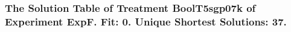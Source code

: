  \begin{frame}
 \fontsize{8pt}{9pt}\selectfont
 \frametitle{ The Solution Table of Treatment BoolT5sgp07k of Experiment ExpF. Fit: 0. Unique Shortest Solutions: 37. }

 \label{ExpFSolutionTable005.tex}  
 \end{frame}

